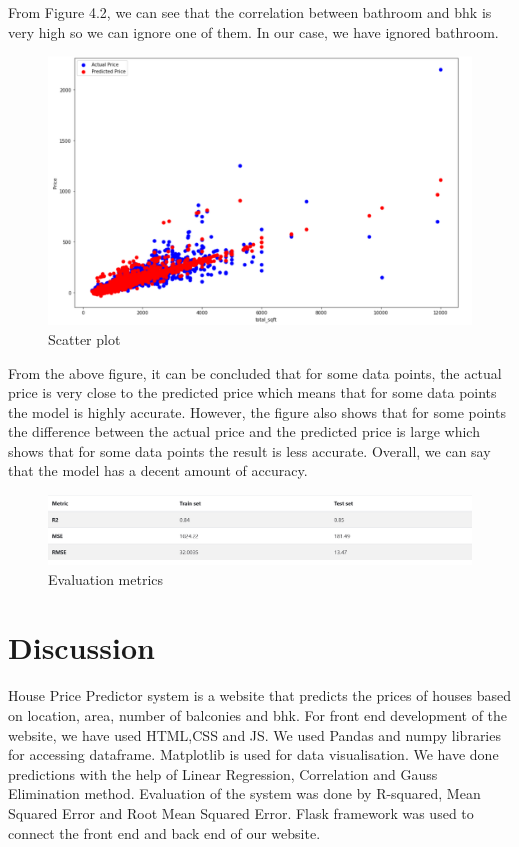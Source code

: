From Figure 4.2, we can see that the correlation between bathroom and bhk is very high so we can ignore one of them. In our case, we have ignored bathroom.
\newpage
\begin{figure} %
\begin{center}
	\includegraphics[width=6in]{scplot.png} 
	\caption{Scatter plot } %
	\label{Scatter plot} %
\end{center}
\end{figure}
From the above figure, it can be concluded that for some data points, the actual price is very close to the predicted price which means that for some data points the model is highly accurate. However, the figure also shows that for some points the difference between the actual price and the predicted price is large which shows that for some data 
points the result is less accurate. Overall, we can say that the model has a decent amount of accuracy.
\begin{figure}[tbh] %
\begin{center}
	\includegraphics[width=6in]{ww.jpg} 
	\caption{Evaluation metrics } %
	\label{Evaluation metrics} %
\end{center}
\end{figure}
\section{Discussion}
\vspace{-18pt}
House Price Predictor system is a website that predicts the prices of houses based on location, area, number of balconies and bhk. For front end development of the website, we have used HTML,CSS and JS. We used Pandas and numpy libraries for accessing dataframe. Matplotlib is used for data visualisation. We have done predictions with the help of Linear Regression, Correlation and Gauss Elimination method. Evaluation of the system was done by R-squared, Mean Squared Error and Root Mean Squared Error. Flask framework was used to connect the front end and back end of our website. 
